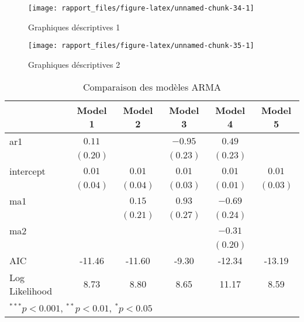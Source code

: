 \documentclass[11pt,]{article}
\begin{document}
\begin{figure}[!htbp]

{\centering \texttt{[image: rapport\_files/figure-latex/unnamed-chunk-34-1]} 

}

\caption{Graphiques déscriptives 1}\label{fig:unnamed-chunk-34}
\end{figure}

\FloatBarrier

\FloatBarrier

\begin{figure}[!htbp]

{\centering \texttt{[image: rapport\_files/figure-latex/unnamed-chunk-35-1]} 

}

\caption{Graphiques déscriptives 2}\label{fig:unnamed-chunk-35}
\end{figure}

\FloatBarrier

\FloatBarrier

\begin{table}[!htbp]
\begin{center}
\begin{tabular}{l c c c c c }
\hline
 & Model 1 & Model 2 & Model 3 & Model 4 & Model 5 \\
\hline
ar1            & $0.11$   &          & $-0.95$  & $0.49$   &          \\
               & $(0.20)$ &          & $(0.23)$ & $(0.23)$ &          \\
intercept      & $0.01$   & $0.01$   & $0.01$   & $0.01$   & $0.01$   \\
               & $(0.04)$ & $(0.04)$ & $(0.03)$ & $(0.01)$ & $(0.03)$ \\
ma1            &          & $0.15$   & $0.93$   & $-0.69$  &          \\
               &          & $(0.21)$ & $(0.27)$ & $(0.24)$ &          \\
ma2            &          &          &          & $-0.31$  &          \\
               &          &          &          & $(0.20)$ &          \\
\hline
AIC            & -11.46   & -11.60   & -9.30    & -12.34   & -13.19   \\
Log Likelihood & 8.73     & 8.80     & 8.65     & 11.17    & 8.59     \\
\hline
\multicolumn{6}{l}{\scriptsize{$^{***}p<0.001$, $^{**}p<0.01$, $^*p<0.05$}}
\end{tabular}
\caption{Comparaison des modèles ARMA}
\label{table:coefficients}
\end{center}
\end{table}
\end{document}
